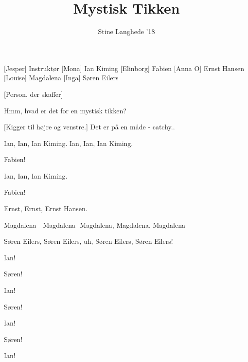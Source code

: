 \documentclass[a4paper,11pt]{article}
\title{Mystisk Tikken}
\author{Stine Langhede '18}
\begin{document}
\maketitle

\begin{roles}
[Jesper] Instruktør
[Mona] Ian Kiming
[Elinborg] Fabien
[Anna O] Ernst Hansen
[Louise] Magdalena
[Inga] Søren Eilers
\end{roles}

\begin{props}
[Person, der skaffer]
\end{props}


\begin{sketch}



 Hmm, hvad er det for en mystisk tikken?

 [Kigger til højre og venstre.] Det er på en måde - catchy..


 Ian, Ian, Ian Kiming.
         Ian, Ian, Ian Kiming.

 Fabien!

 Ian, Ian, Ian Kiming.

 Fabien!


 Ernst, Ernst, Ernst Hansen.

 Magdalena - Magdalena -Magdalena, Magdalena, Magdalena


 Søren Eilers, Søren Eilers, uh, Søren Eilers, Søren Eilers!

 Ian!

 Søren!

 Ian!

 Søren!

 Ian!

 Søren!

 Ian!


\end{sketch}
\end{document}
